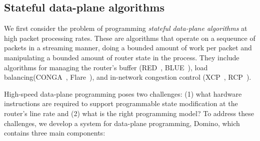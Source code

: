 \subsection{Stateful data-plane algorithms}
We first consider the problem of programming {\em stateful data-plane
algorithms} at high packet processing rates. These are algorithms that operate
on a sequeunce of packets in a streaming manner, doing a bounded amount of work
per packet and manipulating a bounded amount of router state in the process.
They include algorithms for managing the router's buffer (\eg RED~\cite{red},
BLUE~\cite{blue}), load balancing(\eg CONGA~\cite{conga}, Flare~\cite{flare}),
and in-network congestion control (\eg XCP~\cite{xcp}, RCP~\cite{rcp}).

High-speed data-plane programming poses two challenges: (1) what hardware
instructions are required to support programmable state modification at the
router's line rate and (2) what is the right programming model? To address
these challenges, we develop a system for data-plane programming, Domino, which
contains three main components:
